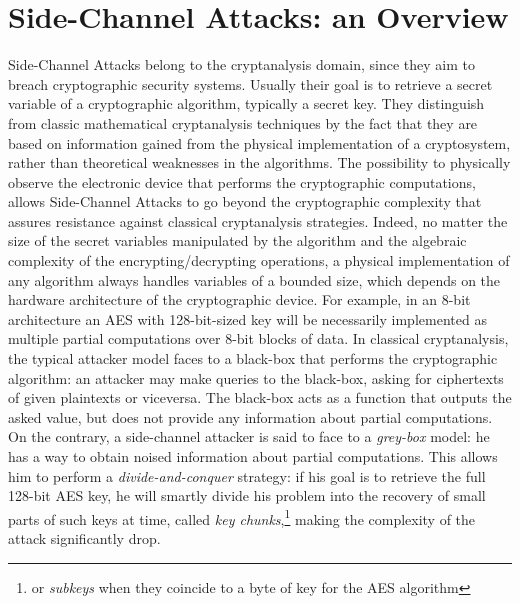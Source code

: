 \section{Side-Channel Attacks: an Overview}
Side-Channel Attacks belong to the cryptanalysis domain, since they aim to breach cryptographic security systems. Usually their goal is to retrieve a secret variable of a cryptographic algorithm, typically a secret key. They distinguish from classic mathematical cryptanalysis techniques by the fact that they are based on information gained from the physical implementation of a cryptosystem, rather than theoretical weaknesses in the algorithms. 
The possibility to physically observe the electronic device that performs the cryptographic computations, allows Side-Channel Attacks to go beyond the cryptographic complexity that assures resistance against classical cryptanalysis strategies.  Indeed, no matter the size of the secret variables manipulated by the algorithm and the algebraic complexity of the encrypting/decrypting operations, a physical implementation of any algorithm always handles variables of a bounded size, which depends on the hardware architecture of the cryptographic device. For example, in an 8-bit architecture an AES with 128-bit-sized key will be necessarily implemented as multiple partial computations over 8-bit blocks of data. In classical cryptanalysis, the typical attacker model faces to a black-box that performs the cryptographic algorithm: an attacker may make queries to the black-box, asking for ciphertexts of given plaintexts or viceversa. The black-box acts as a function that outputs the asked value, but does not provide any information about partial computations. On the contrary, a side-channel attacker is said to face to a \emph{grey-box} model: he has a way to obtain noised information about partial computations. This allows him to perform a \emph{divide-and-conquer} strategy: if his goal is to retrieve the full 128-bit AES key, he will smartly divide his problem into the recovery of small parts of such keys at time, called \emph{key chunks},\footnote{or \emph{subkeys} when they coincide to a byte of key for the AES algorithm} making the complexity of the attack significantly drop. \\

